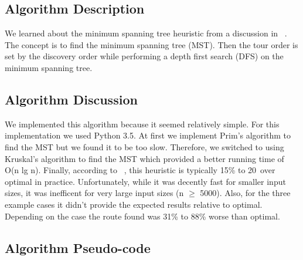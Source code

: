 \documentclass[../report/main.tex]{subfiles}
\begin{document}
\subsection*{Algorithm Description}

We learned about the minimum spanning tree heuristic from a discussion in ~\cite{skiena_2008}.  The concept is to find the minimum spanning tree (MST).  Then the tour order is set by the discovery order while performing a depth first search (DFS) on the minimum spanning tree.

\subsection*{Algorithm Discussion}

We implemented this algorithm because it seemed relatively simple.  For this implementation we used Python 3.5.  At first we implement Prim's algorithm to find the MST but we found it to be too slow.  Therefore, we switched to using Kruskal's algorithm to find the MST which provided a better running time of O(n lg n).  Finally, according to ~\cite{skiena_2008}, this heuristic is typically 15\% to 20\ over optimal in practice.  Unfortunately, while it was decently fast for smaller input sizes, it was inefficent for very large input sizes (n $\geq$ 5000).  Also, for the three example cases it didn't provide the expected results relative to optimal.  Depending on the case the route found was 31\% to 88\% worse than optimal. 

\subsection*{Algorithm Pseudo-code}
\end{document}

